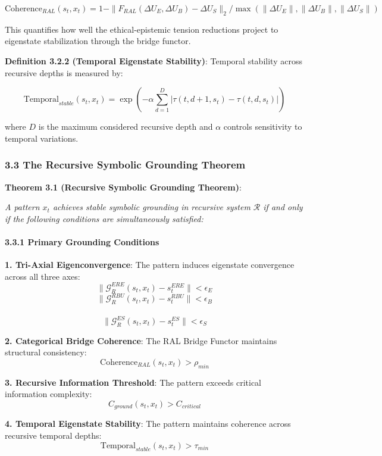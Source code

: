 \documentclass[
]{article}
\begin{document}
\[\text{Coherence}_{RAL}(s_t, x_t) = 1 - \|F_{RAL}(\Delta U_E, \Delta U_B) - \Delta U_S\|_2 / \max(\|\Delta U_E\|, \|\Delta U_B\|, \|\Delta U_S\|)\]

This quantifies how well the ethical-epistemic tension reductions
project to eigenstate stabilization through the bridge functor.

\textbf{Definition 3.2.2 (Temporal Eigenstate Stability)}: Temporal
stability across recursive depths is measured by:

\[\text{Temporal}_{stable}(s_t, x_t) = \exp\left(-\alpha \sum_{d=1}^{D} |\tau(t, d+1, s_t) - \tau(t, d, s_t)|\right)\]

where \(D\) is the maximum considered recursive depth and \(\alpha\)
controls sensitivity to temporal variations.

\subsubsection{3.3 The Recursive Symbolic Grounding
Theorem}\label{the-recursive-symbolic-grounding-theorem-1}

\textbf{Theorem 3.1 (Recursive Symbolic Grounding Theorem)}:

\emph{A pattern \(x_t\) achieves stable symbolic grounding in recursive
system \(\mathcal{R}\) if and only if the following conditions are
simultaneously satisfied:}

\paragraph{3.3.1 Primary Grounding
Conditions}\label{primary-grounding-conditions}

\textbf{1. Tri-Axial Eigenconvergence}: The pattern induces eigenstate
convergence across all three axes:
\[\|\mathcal{G}_R^{ERE}(s_t, x_t) - s_t^{ERE}\| < \epsilon_E\]
\[\|\mathcal{G}_R^{RBU}(s_t, x_t) - s_t^{RBU}\| < \epsilon_B\]\\
\[\|\mathcal{G}_R^{ES}(s_t, x_t) - s_t^{ES}\| < \epsilon_S\]

\textbf{2. Categorical Bridge Coherence}: The RAL Bridge Functor
maintains structural consistency:
\[\text{Coherence}_{RAL}(s_t, x_t) > \rho_{min}\]

\textbf{3. Recursive Information Threshold}: The pattern exceeds
critical information complexity: \[C_{ground}(s_t, x_t) > C_{critical}\]

\textbf{4. Temporal Eigenstate Stability}: The pattern maintains
coherence across recursive temporal depths:
\[\text{Temporal}_{stable}(s_t, x_t) > \tau_{min}\]
\end{document}
